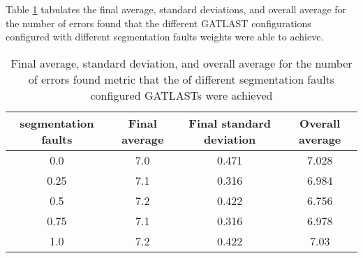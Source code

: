 Table \ref{tab:HP:GA:SegFault:number of errors found} tabulates the final average, standard deviations, and overall average for the number of errors found that the different GATLAST configurations configured with different segmentation faults weights were able to achieve.
\begin{table}[tbh!]
\centering
\begin{adjustbox}{trim=0cm 0cm 0cm 0cm, clip=true}
\begin{tabular}{|c|c|c|c|}
\hline
segmentation faults & Final average & Final standard deviation & Overall average\\
\hline
0.0 & 7.0 & 0.471 & 7.028\\\hline
0.25 & 7.1 & 0.316 & 6.984\\\hline
0.5 & 7.2 & 0.422 & 6.756\\\hline
0.75 & 7.1 & 0.316 & 6.978\\\hline
1.0 & 7.2 & 0.422 & 7.03\\\hline
\end{tabular}
\end{adjustbox}
\caption{Final average, standard deviation, and overall average for the number of errors found metric that the of different segmentation faults configured GATLASTs were achieved}
\label{tab:HP:GA:SegFault:number of errors found}
\end{table}